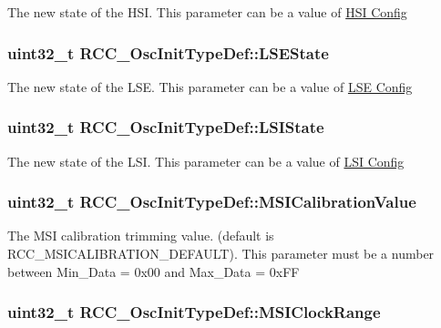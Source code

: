 The new state of the H\-S\-I. This parameter can be a value of \hyperlink{group___r_c_c___h_s_i___config}{H\-S\-I Config} \hypertarget{struct_r_c_c___osc_init_type_def_a7c1294e9407e69e80fe034caf35fe7ea}{
\subsubsection[{L\-S\-E\-State}]{\setlength{\rightskip}{0pt plus 5cm}uint32\-\_\-t R\-C\-C\-\_\-\-Osc\-Init\-Type\-Def\-::\-L\-S\-E\-State}}\label{struct_r_c_c___osc_init_type_def_a7c1294e9407e69e80fe034caf35fe7ea}
The new state of the L\-S\-E. This parameter can be a value of \hyperlink{group___r_c_c___l_s_e___config}{L\-S\-E Config} \hypertarget{struct_r_c_c___osc_init_type_def_a955de90db8882fde02c4fb59c7c000f0}{
\subsubsection[{L\-S\-I\-State}]{\setlength{\rightskip}{0pt plus 5cm}uint32\-\_\-t R\-C\-C\-\_\-\-Osc\-Init\-Type\-Def\-::\-L\-S\-I\-State}}\label{struct_r_c_c___osc_init_type_def_a955de90db8882fde02c4fb59c7c000f0}
The new state of the L\-S\-I. This parameter can be a value of \hyperlink{group___r_c_c___l_s_i___config}{L\-S\-I Config} \hypertarget{struct_r_c_c___osc_init_type_def_a62152a6e80ade492afa6753ea2acc673}{
\subsubsection[{M\-S\-I\-Calibration\-Value}]{\setlength{\rightskip}{0pt plus 5cm}uint32\-\_\-t R\-C\-C\-\_\-\-Osc\-Init\-Type\-Def\-::\-M\-S\-I\-Calibration\-Value}}\label{struct_r_c_c___osc_init_type_def_a62152a6e80ade492afa6753ea2acc673}
The M\-S\-I calibration trimming value. (default is R\-C\-C\-\_\-\-M\-S\-I\-C\-A\-L\-I\-B\-R\-A\-T\-I\-O\-N\-\_\-\-D\-E\-F\-A\-U\-L\-T). This parameter must be a number between Min\-\_\-\-Data = 0x00 and Max\-\_\-\-Data = 0x\-F\-F \hypertarget{struct_r_c_c___osc_init_type_def_adaab402d37223348fcc96aeaf7643045}{
\subsubsection[{M\-S\-I\-Clock\-Range}]{\setlength{\rightskip}{0pt plus 5cm}uint32\-\_\-t R\-C\-C\-\_\-\-Osc\-Init\-Type\-Def\-::\-M\-S\-I\-Clock\-Range}}\label{struct_r_c_c___osc_init_type_def_adaab402d37223348fcc96aeaf7643045}
